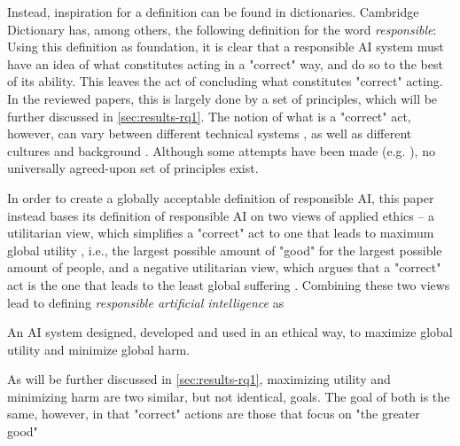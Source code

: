 Instead, inspiration for a definition can be found in dictionaries. Cambridge Dictionary \parencite{dictionary_responsible} has, among others, the following definition for the word \textit{responsible}:  Using this definition as foundation, it is clear that a responsible AI system must have an idea of what constitutes acting in a "correct" way, and do so to the best of its ability. This leaves the act of concluding what constitutes "correct" acting. In the reviewed papers, this is largely done by a set of principles, which will be further discussed in \autoref{sec:results-rq1}. The notion of what is a "correct" act, however, can vary between different technical systems \parencite{Hagendorff_2020}, as well as different cultures and background \parencite{Ford_1994}. Although some attempts have been made (e.g. \cite{Jobin_2019,Hagendorff_2020}), no universally agreed-upon set of principles exist.

In order to create a globally acceptable definition of responsible AI, this paper instead bases its definition of responsible AI on two views of applied ethics -- a utilitarian view, which simplifies a "correct" act to one that leads to maximum global utility \parencite{Lang_2004}, i.e., the largest possible amount of "good" for the largest possible amount of people, and a negative utilitarian view, which argues that a "correct" act is the one that leads to the least global suffering \parencite{Gandjour_2003_negativeutilitarianism}.  Combining these two views lead to defining \textit{responsible artificial intelligence} as
\begin{displayquote}
    An AI system designed, developed and used in an ethical way, to maximize global utility and minimize global harm.
\end{displayquote}


As will be further discussed in \autoref{sec:results-rq1}, maximizing utility and minimizing harm are two similar, but not identical, goals. The goal of both is the same, however, in that "correct" actions are those that focus on "the greater good"

